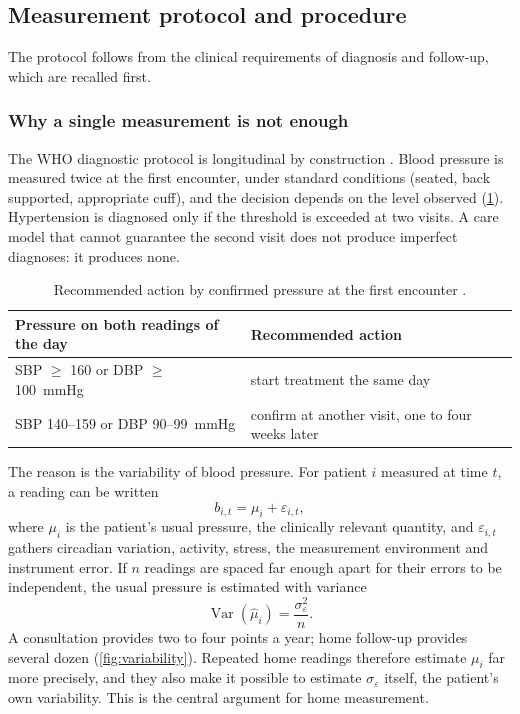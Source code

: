 \subsection{Measurement protocol and procedure}\label{sec:clinical-req}\label{sec:protocol-gap}

The protocol follows from the clinical requirements of diagnosis and follow-up, which are recalled first.

\subsubsection{Why a single measurement is not enough}\label{sec:variability}\label{sec:dx-requires}

The WHO diagnostic protocol is longitudinal by construction \parencite{who2023hypertension}. Blood pressure is measured twice at the first encounter, under standard conditions (seated, back supported, appropriate cuff), and the decision depends on the level observed (\cref{tab:protocol}). Hypertension is diagnosed only if the threshold is exceeded at two visits. A care model that cannot guarantee the second visit does not produce imperfect diagnoses: it produces none.

\begin{table}[htbp]
\centering\small
\caption{Recommended action by confirmed pressure at the first encounter \parencite{who2023hypertension}.}\label{tab:protocol}
\begin{tabularx}{\textwidth}{@{}>{\raggedright\arraybackslash}p{6.2cm} X@{}}
\toprule
\textbf{Pressure on both readings of the day} & \textbf{Recommended action} \\
\midrule
SBP $\geq$ 160 or DBP $\geq$ 100~mmHg & start treatment the same day \\
SBP 140--159 or DBP 90--99~mmHg & confirm at another visit, one to four weeks later \\
\bottomrule
\end{tabularx}
\end{table}

The reason is the variability of blood pressure. For patient $i$ measured at time $t$, a reading can be written
\begin{equation}
  b_{i,t} = \mu_i + \varepsilon_{i,t},
\end{equation}
where $\mu_i$ is the patient's usual pressure, the clinically relevant quantity, and $\varepsilon_{i,t}$ gathers circadian variation, activity, stress, the measurement environment and instrument error. If $n$ readings are spaced far enough apart for their errors to be independent, the usual pressure is estimated with variance
\begin{equation}
  \operatorname{Var}(\hat\mu_i) = \frac{\sigma_\varepsilon^2}{n}.
\end{equation}
A consultation provides two to four points a year; home follow-up provides several dozen (\cref{fig:variability}). Repeated home readings therefore estimate $\mu_i$ far more precisely, and they also make it possible to estimate $\sigma_\varepsilon$ itself, the patient's own variability. This is the central argument for home measurement.

